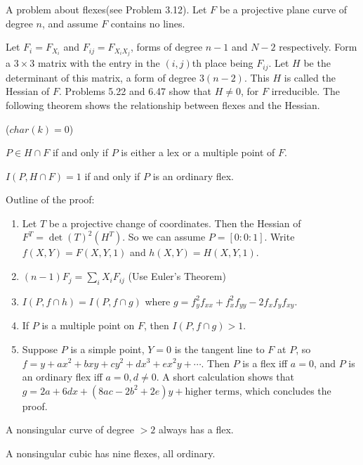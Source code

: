 \documentclass{solution}
\begin{document}
\begin{problem}{5.23}
    A problem about flexes(see Problem 3.12). Let $F$ be a projective plane curve of degree $n$, and assume $F$ contains no lines.

    Let $F_i = F_{X_i}$ and $F_{ij} = F_{X_iX_j}$, forms of degree $n - 1$ and $N - 2$ respectively. Form a $3 \times 3$ matrix with the entry in the $(i, j)$th place being $F_{ij}$. Let $H$ be the determinant of this matrix, a form of degree $3(n - 2)$. This $H$ is called the Hessian of $F$. Problems 5.22 and 6.47 show that $H \ne 0$, for $F$ irreducible. The following theorem shows the relationship between flexes and the Hessian.

    \begin{theorem}
        ($char(k) = 0$) \begin{inparaenum}[(1)]
            \item $P \in H \cap F$ if and only if $P$ is either a lex or a multiple point of $F$.
            \item $I(P, H \cap F) = 1$ if and only if $P$ is an ordinary flex.
        \end{inparaenum}
    \end{theorem}

    Outline of the proof:
    \begin{enumerate}
        \item Let $T$ be a projective change of coordinates. Then the Hessian of $F^T = \det(T)^2(H^T)$. So we can assume $P = [0:0:1]$. Write $f(X, Y) = F(X, Y, 1)$ and $h(X, Y) = H(X, Y, 1)$.
        \item $(n - 1) F_j = \sum\limits_{i} X_i F_{ij}$ (Use Euler's Theorem)
        \item $I(P, f \cap h) = I(P, f \cap g)$ where $g = f_y^2f_{xx} + f_x^2 f_{yy} - 2f_xf_yf_{xy}$.
        \item If $P$ is a multiple point on $F$, then $I(P, f \cap g) \gt 1$.
        \item Suppose $P$ is a simple point, $Y = 0$ is the tangent line to $F$ at $P$, so $f = y + ax^2 + bxy + cy^2 + dx^3 + ex^2y + \cdots$. Then $P$ is a flex iff $a = 0$, and $P$ is an ordinary flex iff $a = 0, d \ne 0$. A short calculation shows that $g = 2a + 6dx + (8ac - 2b^2 + 2e)y + \text{higher terms}$, which concludes the proof.
    \end{enumerate}

    \begin{corollary}
        \begin{inparaenum}[(1)]
            \item A nonsingular curve of degree $\gt 2$ always has a flex. 
            \item A nonsingular cubic has nine flexes, all ordinary.
        \end{inparaenum}
    \end{corollary}
\end{problem}
\end{document}
